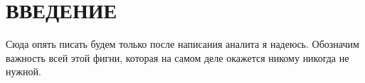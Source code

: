 \section*{ВВЕДЕНИЕ}

Сюда опять писать будем только после написания аналита я надеюсь. Обозначим важность всей	этой фигни, которая на самом деле окажется никому никогда не нужной.

\pagebreak